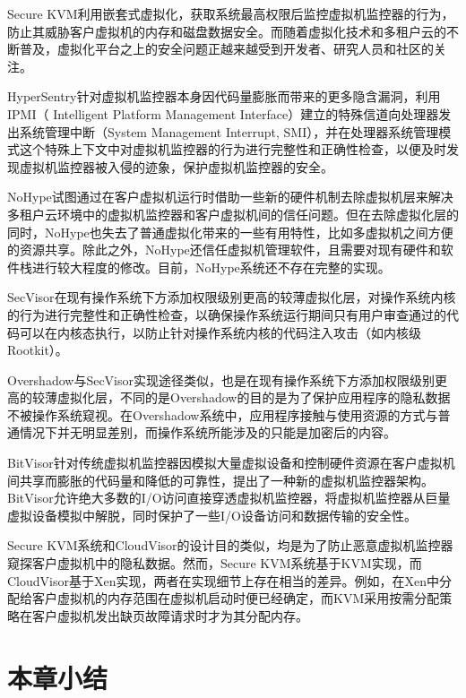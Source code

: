 Secure KVM利用嵌套式虚拟化，获取系统最高权限后监控虚拟机监控器的行为，防止其威胁客户虚拟机的内存和磁盘数据安全。而随着虚拟化技术和多租户云的不断普及，虚拟化平台之上的安全问题正越来越受到开发者、研究人员和社区的关注。

HyperSentry\cite{azab2010hypersentry}针对虚拟机监控器本身因代码量膨胀而带来的更多隐含漏洞，利用IPMI（ Intelligent Platform Management Interface）建立的特殊信道向处理器发出系统管理中断（System Management Interrupt, SMI），并在处理器系统管理模式这个特殊上下文中对虚拟机监控器的行为进行完整性和正确性检查，以便及时发现虚拟机监控器被入侵的迹象，保护虚拟机监控器的安全。

NoHype\cite{keller2010nohype}试图通过在客户虚拟机运行时借助一些新的硬件机制去除虚拟机层来解决多租户云环境中的虚拟机监控器和客户虚拟机间的信任问题。但在去除虚拟化层的同时，NoHype也失去了普通虚拟化带来的一些有用特性，比如多虚拟机之间方便的资源共享。除此之外，NoHype还信任虚拟机管理软件，且需要对现有硬件和软件栈进行较大程度的修改。目前，NoHype系统还不存在完整的实现。

SecVisor\cite{seshadri2007secvisor}在现有操作系统下方添加权限级别更高的较薄虚拟化层，对操作系统内核的行为进行完整性和正确性检查，以确保操作系统运行期间只有用户审查通过的代码可以在内核态执行，以防止针对操作系统内核的代码注入攻击（如内核级Rootkit）。

Overshadow\cite{chen2008overshadow}与SecVisor实现途径类似，也是在现有操作系统下方添加权限级别更高的较薄虚拟化层，不同的是Overshadow的目的是为了保护应用程序的隐私数据不被操作系统窥视。在Overshadow系统中，应用程序接触与使用资源的方式与普通情况下并无明显差别，而操作系统所能涉及的只能是加密后的内容。

BitVisor\cite{shinagawa2009bitvisor}针对传统虚拟机监控器因模拟大量虚拟设备和控制硬件资源在客户虚拟机间共享而膨胀的代码量和降低的可靠性，提出了一种新的虚拟机监控器架构。BitVisor允许绝大多数的I/O访问直接穿透虚拟机监控器，将虚拟机监控器从巨量虚拟设备模拟中解脱，同时保护了一些I/O设备访问和数据传输的安全性。

Secure KVM系统和CloudVisor\cite{zhang2011cloudvisor}的设计目的类似，均是为了防止恶意虚拟机监控器窥探客户虚拟机中的隐私数据。然而，Secure KVM系统基于KVM实现，而CloudVisor基于Xen实现，两者在实现细节上存在相当的差异。例如，在Xen中分配给客户虚拟机的内存范围在虚拟机启动时便已经确定，而KVM采用按需分配策略在客户虚拟机发出缺页故障请求时才为其分配内存。

\section{本章小结}

